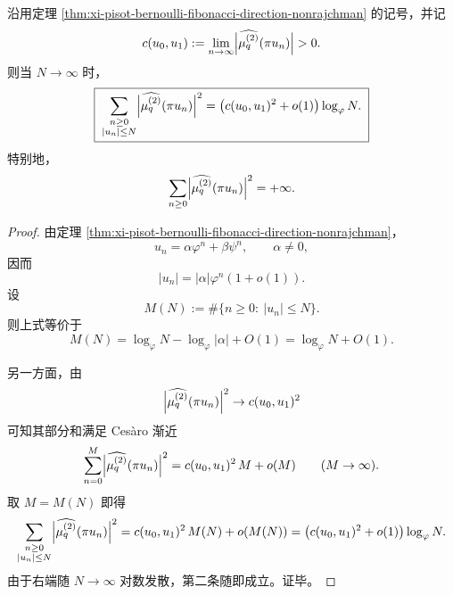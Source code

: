 \begin{corollary}\label{cor:xi-pisot-bernoulli-fibonacci-direction-log-energy}
沿用定理 \ref{thm:xi-pisot-bernoulli-fibonacci-direction-nonrajchman} 的记号，并记
\[
c(u_0,u_1)
:=
\lim_{n\to\infty}\Bigl|\widehat{\mu_q^{(2)}}(\pi u_n)\Bigr|
>0.
\]
则当 \(N\to\infty\) 时，
\[
\boxed{\;
\sum_{\substack{n\ge 0\\ |u_n|\le N}}
\Bigl|\widehat{\mu_q^{(2)}}(\pi u_n)\Bigr|^2
=
\bigl(c(u_0,u_1)^2+o(1)\bigr)\log_\varphi N.
\;}
\]
特别地，
\[
\sum_{n\ge 0}\Bigl|\widehat{\mu_q^{(2)}}(\pi u_n)\Bigr|^2=+\infty.
\]
\end{corollary}
\begin{proof}
由定理 \ref{thm:xi-pisot-bernoulli-fibonacci-direction-nonrajchman}，
\[
u_n=\alpha\varphi^n+\beta\psi^n,
\qquad
\alpha\neq 0,
\]
因而
\[
|u_n|=|\alpha|\varphi^n(1+o(1)).
\]
设
\[
M(N):=\#\{n\ge 0:\ |u_n|\le N\}.
\]
则上式等价于
\[
M(N)=\log_\varphi N-\log_\varphi|\alpha|+O(1)
=
\log_\varphi N+O(1).
\]

另一方面，由
\[
\Bigl|\widehat{\mu_q^{(2)}}(\pi u_n)\Bigr|^2\to c(u_0,u_1)^2
\]
可知其部分和满足 Ces\`aro 渐近
\[
\sum_{n=0}^{M}\Bigl|\widehat{\mu_q^{(2)}}(\pi u_n)\Bigr|^2
=
c(u_0,u_1)^2\,M+o(M)
\qquad(M\to\infty).
\]
取 \(M=M(N)\) 即得
\[
\sum_{\substack{n\ge 0\\ |u_n|\le N}}
\Bigl|\widehat{\mu_q^{(2)}}(\pi u_n)\Bigr|^2
=
c(u_0,u_1)^2\,M(N)+o(M(N))
=
\bigl(c(u_0,u_1)^2+o(1)\bigr)\log_\varphi N.
\]
由于右端随 \(N\to\infty\) 对数发散，第二条随即成立。证毕。
\end{proof}


